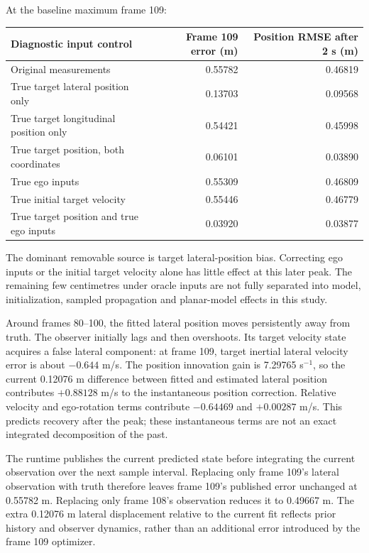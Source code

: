 \documentclass[11pt]{article}
\begin{document}
At the baseline maximum frame 109:
\begin{center}\small
\begin{tabular}{@{}lrr@{}}\toprule
Diagnostic input control & Frame 109 error (m) & Position RMSE after 2 s (m) \\\midrule
Original measurements & 0.55782 & 0.46819 \\
True target lateral position only & 0.13703 & 0.09568 \\
True target longitudinal position only & 0.54421 & 0.45998 \\
True target position, both coordinates & 0.06101 & 0.03890 \\
True ego inputs & 0.55309 & 0.46809 \\
True initial target velocity & 0.55446 & 0.46779 \\
True target position and true ego inputs & 0.03920 & 0.03877 \\
\bottomrule\end{tabular}
\end{center}
The dominant removable source is target lateral-position bias. Correcting
ego inputs or the initial target velocity alone has little effect at this
later peak. The remaining few centimetres under oracle inputs are not fully
separated into model, initialization, sampled propagation and planar-model
effects in this study.

Around frames 80--100, the fitted lateral position moves persistently away
from truth. The observer initially lags and then overshoots. Its target
velocity state acquires a false lateral component: at frame 109, target
inertial lateral velocity error is about $-0.644$ m/s. The position innovation
gain is 7.29765 s$^{-1}$, so the current 0.12076 m difference between fitted
and estimated lateral position contributes $+0.88128$ m/s to the instantaneous
position correction. Relative velocity and ego-rotation terms contribute
$-0.64469$ and $+0.00287$ m/s. This predicts recovery after the peak; these
instantaneous terms are not an exact integrated decomposition of the past.

The runtime publishes the current predicted state before integrating the
current observation over the next sample interval. Replacing only frame
109's lateral observation with truth therefore leaves frame 109's published
error unchanged at 0.55782 m. Replacing only frame 108's observation reduces
it to 0.49667 m. The extra 0.12076 m lateral displacement relative to the
current fit reflects prior history and observer dynamics, rather than an
additional error introduced by the frame 109 optimizer.
\end{document}
